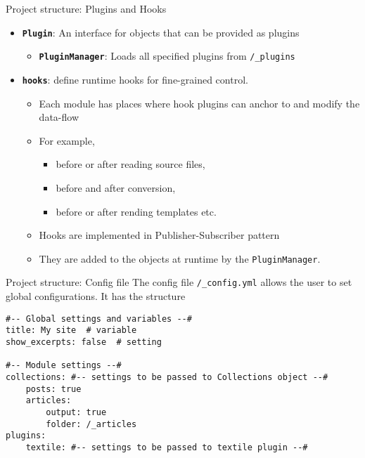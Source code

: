 \documentclass[compress, aspectratio=169]{beamer}
\renewcommand{\imp}[1]{\texttt{\textbf{#1}}}
\begin{document}
\begin{frame}{Project structure: Plugins and Hooks}
    \begin{itemize}
        \item \imp{Plugin}: An interface for objects that can be provided as plugins
            \begin{itemize}
                \item \imp{PluginManager}: Loads all specified plugins from
                    \texttt{/_plugins}
            \end{itemize}
            \pause
        \item \imp{hooks}: define runtime hooks for fine-grained control. 
            \begin{itemize}
                \item Each module has places where hook plugins can anchor to and
                    modify the data-flow \pause
                \item For example, 
                    \begin{itemize}
                        \item before or after reading source files,
                        \item before and after conversion, 
                        \item before or after rending templates etc.
                    \end{itemize}
                    \pause
                \item Hooks are implemented in Publisher-Subscriber pattern \pause
                \item They are added to the objects at runtime by the
                    \texttt{PluginManager}.
            \end{itemize}
    \end{itemize}
\end{frame}

\begin{frame}[fragile]{Project structure: Config file}
    The config file \texttt{/_config.yml} allows the user to set global configurations.
    It has the structure
\begin{lstlisting}[style=myyml]
#-- Global settings and variables --#
title: My site  # variable
show_excerpts: false  # setting

#-- Module settings --#
collections: #-- settings to be passed to Collections object --#
    posts: true
    articles: 
        output: true
        folder: /_articles
plugins:
    textile: #-- settings to be passed to textile plugin --#
\end{lstlisting}
\end{frame}
\end{document}
